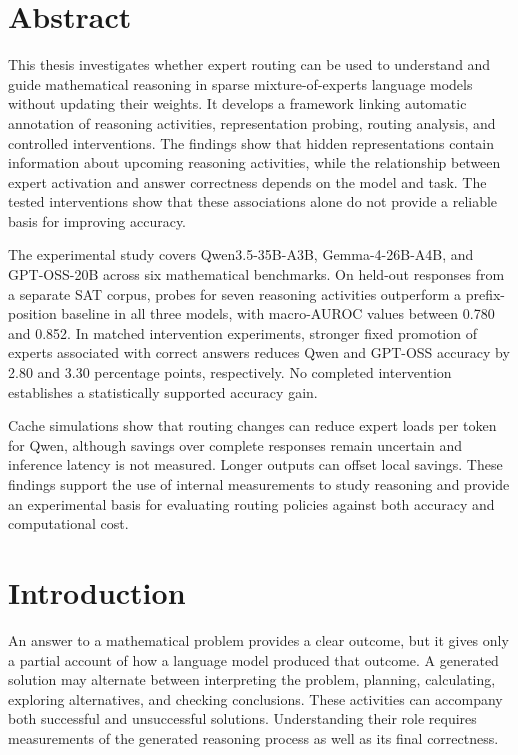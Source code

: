 \documentclass[12pt,a4paper,twoside,openright]{book}
\begin{document}
\frontmatter

\maketitle

\chapter*{Abstract}

This thesis investigates whether expert routing can be used to understand and
guide mathematical reasoning in sparse mixture-of-experts language models
without updating their weights. It develops a framework linking automatic
annotation of reasoning activities, representation probing, routing analysis,
and controlled interventions. The findings show that hidden representations
contain information about upcoming reasoning activities, while the relationship
between expert activation and answer correctness depends on the model and task.
The tested interventions show that these associations alone do not provide a
reliable basis for improving accuracy.

The experimental study covers Qwen3.5-35B-A3B, Gemma-4-26B-A4B, and GPT-OSS-20B
across six mathematical benchmarks. On held-out responses from a separate SAT
corpus, probes for seven reasoning activities outperform a prefix-position
baseline in all three models, with macro-AUROC values between 0.780 and 0.852.
In matched intervention experiments, stronger fixed promotion of experts
associated with correct answers reduces Qwen and GPT-OSS accuracy by 2.80 and
3.30 percentage points, respectively. No completed intervention establishes a
statistically supported accuracy gain.

Cache simulations show that routing changes can reduce expert loads per token
for Qwen, although savings over complete responses remain uncertain and
inference latency is not measured. Longer outputs can offset local savings.
These findings support the use of internal measurements to study reasoning and
provide an experimental basis for evaluating routing policies against both
accuracy and computational cost.

\chapter*{Introduction}

An answer to a mathematical problem provides a clear outcome, but it gives
only a partial account of how a language model produced that outcome. A
generated solution may alternate between interpreting the problem,
planning, calculating, exploring alternatives, and checking conclusions.
These activities can accompany both successful and unsuccessful solutions.
Understanding their role requires measurements of the generated reasoning
process as well as its final correctness.
\end{document}
